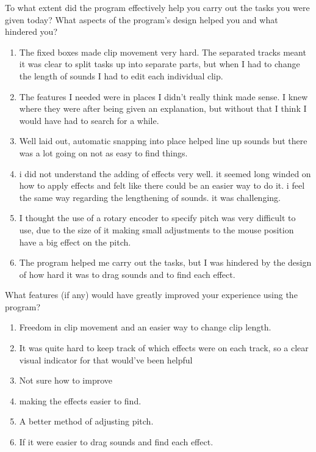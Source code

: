 \documentclass[12pt,a4paper,oneside,openright]{report}
\begin{document}
To what extent did the program effectively help you carry out the tasks you were given today? What aspects of the program's design helped you and what hindered you? 
\begin{enumerate}
    \item The fixed boxes made clip movement very hard. The separated tracks meant it was clear to split tasks up into separate parts, but when I had to change the length of sounds I had to edit each individual clip.
    \item The features I needed were in places I didn’t really think made sense. I knew where they were after being given an explanation, but without that I think I would have had to search for a while.
    \item Well laid out, automatic snapping into place helped line up sounds but there was a lot going on not as easy to find things.
    \item i did not understand the adding of effects very well. it seemed long winded on how to apply effects and felt like there could be an easier way to do it. i feel the same way regarding the lengthening of sounds. it was challenging.
    \item I thought the use of a rotary encoder to specify pitch was very difficult to use, due to the size of it making small adjustments to the mouse position have a big effect on the pitch.
    \item The program helped me carry out the tasks, but I was hindered by the design of how hard it was to drag sounds and to find each effect.
\end{enumerate}

What features (if any) would have greatly improved your experience using the program?
\begin{enumerate}
    \item Freedom in clip movement and an easier way to change clip length.
    \item It was quite hard to keep track of which effects were on each track, so a clear visual indicator for that would’ve been helpful
    \item Not sure how to improve
\item making the effects easier to find.
\item A better method of adjusting pitch.
\item If it were easier to drag sounds and find each effect.
\end{enumerate}
\end{document}
